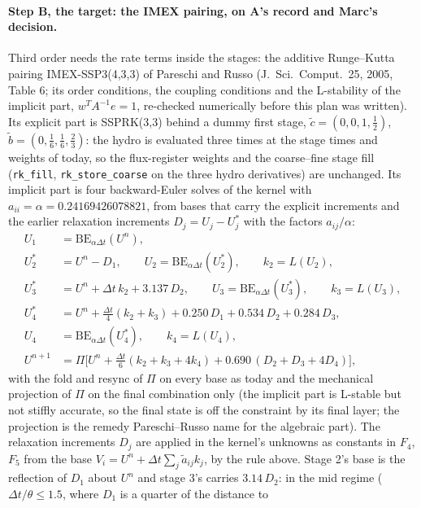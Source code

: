 \documentclass[11pt,a4paper]{article}
\newcommand{\code}[1]{\texttt{\small #1}}
\newcommand{\Dt}{\Delta t}
\begin{document}
\paragraph{Step B, the target: the IMEX pairing, on A's record and Marc's decision.}
Third order needs the rate terms inside the stages: the additive
Runge--Kutta pairing IMEX-SSP3(4,3,3) of Pareschi and Russo (J.\ Sci.\
Comput.\ 25, 2005, Table 6; its order conditions, the coupling
conditions and the L-stability of the implicit part, $w^T A^{-1} e = 1$,
re-checked numerically before this plan was written).  Its explicit
part is SSPRK(3,3) behind a dummy first stage, $\tilde c = (0, 0, 1,
\tfrac12)$, $\tilde b = (0, \tfrac16, \tfrac16, \tfrac23)$: the hydro is
evaluated three times at the stage times and weights of today, so the
flux-register weights and the coarse--fine stage fill
(\code{rk\_fill}, \code{rk\_store\_coarse} on the three hydro
derivatives) are unchanged.  Its implicit part is four backward-Euler
solves of the kernel with $a_{ii} = \alpha = 0.24169426078821$, from
bases that carry the explicit increments and the earlier relaxation
increments $D_j = U_j - U_j^{*}$ with the factors $a_{ij}/\alpha$:
\begin{align}
U_1 &= \mathrm{BE}_{\alpha\Dt}(U^n), \\
U_2^{*} &= U^n - D_1, \qquad U_2 = \mathrm{BE}_{\alpha\Dt}(U_2^{*}), \qquad k_2 = L(U_2), \\
U_3^{*} &= U^n + \Dt\,k_2 + 3.137\,D_2, \qquad U_3 = \mathrm{BE}_{\alpha\Dt}(U_3^{*}), \qquad k_3 = L(U_3), \\
U_4^{*} &= U^n + \tfrac{\Dt}{4}(k_2 + k_3) + 0.250\,D_1 + 0.534\,D_2 + 0.284\,D_3, \\
U_4 &= \mathrm{BE}_{\alpha\Dt}(U_4^{*}), \qquad k_4 = L(U_4), \\
U^{n+1} &= \Pi\big[U^n + \tfrac{\Dt}{6}(k_2 + k_3 + 4k_4) + 0.690\,(D_2 + D_3 + 4D_4)\big],
\end{align}
with the fold and resync of $\Pi$ on every base as today and the
mechanical projection of $\Pi$ on the final combination only (the
implicit part is L-stable but not stiffly accurate, so the final state
is off the constraint by its final layer; the projection is the remedy
Pareschi--Russo name for the algebraic part).  The relaxation
increments $D_j$ are applied in the kernel's unknowns as constants in
$F_4$, $F_5$ from the base $V_i = U^n + \Dt\sum_j \tilde a_{ij} k_j$,
by the rule above.  Stage 2's base is the reflection of $D_1$ about
$U^n$ and stage 3's carries $3.14\,D_2$: in the mid regime
($\Dt/\theta \le 1.5$, where $D_1$ is a quarter of the distance to
\end{document}
